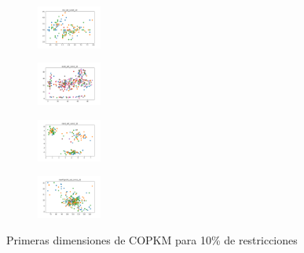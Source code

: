 \begin{figure}[H]
\begin{subfigure}
        \centering
        \includegraphics[width=0.234\textwidth]{img/hs/iris_set_const_10_3773969821_clust.png}
    \end{subfigure}
    \hfill
    \begin{subfigure}
        \centering
        \includegraphics[width=0.234\textwidth]{img/hs/ecoli_set_const_10_3773969821_clust.png}
    \end{subfigure}
    \hfill
    \begin{subfigure}
        \centering
        \includegraphics[width=0.234\textwidth]{img/hs/rand_set_const_10_3773969821_clust.png}
    \end{subfigure}
    \hfill
    \begin{subfigure}
        \centering
        \includegraphics[width=0.234\textwidth]{img/hs/newthyroid_set_const_10_3773969821_clust.png}
    \end{subfigure}
    \caption{Primeras dimensiones de COPKM para 10\% de restricciones}
\end{figure}

\vspace*{\fill}
\newpage
\vspace*{\fill}


